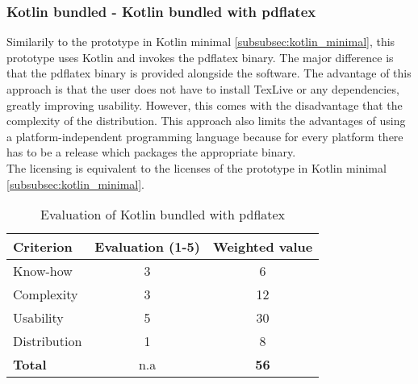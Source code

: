\subsubsection{Kotlin bundled - Kotlin bundled with pdflatex}
\label{sec:kotlin_bundled}
Similarily to the prototype in Kotlin minimal \ref{subsubsec:kotlin_minimal}, this prototype uses Kotlin and invokes the pdflatex binary. The major difference is that the pdflatex binary is provided alongside
the software. The advantage of this approach is that the user does not have to install TexLive or any dependencies, greatly improving usability. However, this comes with the disadvantage
that the complexity of the distribution. This approach also limits the advantages of using a platform-independent programming language because for every platform there has to be a release
which packages the appropriate binary.\\
The licensing is equivalent to the licenses of the prototype in Kotlin minimal \ref{subsubsec:kotlin_minimal}.\\
\begin{table}[H]
    \centering
    \begin{tabular}{|l|c|c|}
        \hline
        \textbf{Criterion} & \textbf{Evaluation (1-5)} & \textbf{Weighted value} \\
        \hline
        Know-how & 3 & 6 \\
        \hline
        Complexity & 3 & 12 \\
        \hline
        Usability & 5 & 30 \\
        \hline
        Distribution & 1 & 8 \\
        \hline
        \textbf{Total} & n.a & \textbf{56} \\
        \hline
    \end{tabular}
    \caption{Evaluation of Kotlin bundled with pdflatex}
    \label{table:kotlin_bundled_evaluation}
\end{table}

